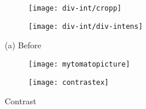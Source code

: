 \begin{figure}
	\centering
	\begin{subfigure}[b]{0.4\textwidth}
		\texttt{[image: div-int/cropp]}
		\caption{}
		\label{fig:large-cropp}
	\end{subfigure}
	\begin{subfigure}[b]{0.4\textwidth}
		\texttt{[image: div-int/div-intens]}
		\caption{}
		\label{fig:large-cropp-after}
	\end{subfigure}
	\caption{(a) Before}
	\label{fig:large-cropp}
\end{figure}

\begin{figure}
	\centering
	\begin{subfigure}[b]{0.4\textwidth}
		\texttt{[image: mytomatopicture]}
		\caption{}
		\label{fig:tom}
	\end{subfigure}
	\begin{subfigure}[b]{0.4\textwidth}
		\texttt{[image: contrastex]}
		\caption{}
		\label{fig:cont}
	\end{subfigure}
	\caption{Contrast}
	\label{fig:contrastex}
\end{figure}

